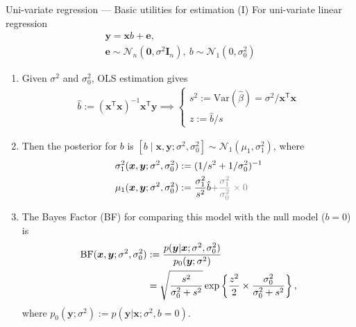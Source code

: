 \documentclass[10pt]{beamer}
\begin{document}
\begin{frame}[allowframebreaks]{Uni-variate regression --- \normalsize Basic utilities for estimation (I)}
    For uni-variate linear regression
    \begin{gather}
        \bm{y} = \bm{x}b + \bm{e},\\
        \bm{e} \sim \mathcal{N}_n(\bm{0},\sigma^2\bm{I}_n),\
        b\sim\mathcal{N}_1(0,\sigma^2_0)
    \end{gather}
    \begin{enumerate}
        \item Given $\sigma^2$ and $\sigma_0^2$, OLS estimation gives
        \begin{gather}
            \hat{b} := (\bm{x}^\mathsf{T}\bm{x})^{-1}\bm{x}^\mathsf{T}\bm{y}
            \implies \begin{cases}
                s^2 := \text{Var}(\hat{\beta}) = {\sigma^2}/{\bm{x}^\mathsf{T}\bm{x}} \\
                z := {\hat{b}}/{s}
            \end{cases}
        \end{gather}

        \item Then the posterior for $b$ is $[b\mid\bm{x},\bm{y};\sigma^2,\sigma_0^2]\sim\mathcal{N}_1(\mu_1,\sigma^2_1)$, where
        \begin{align}
            \sigma_1^2(\bm{x},\bm{y};\sigma^2,\sigma_0^2) 
            & := (1/s^2 + 1/\sigma_0^2)^{-1} \\
            \mu_1(\bm{x},\bm{y};\sigma^2,\sigma_0^2) 
            & := \frac{\sigma_1^2}{s^2}\hat{b}{\color{gray} + \frac{\sigma_1^2}{\sigma_0^2}\times 0}
        \end{align}
        
        \newpage
        
        \item The Bayes Factor (BF) for comparing this model with the null model ($b=0$) is
        \begin{align}
            \text{BF}(\bm{x},\bm{y};\sigma^2,\sigma_0^2)
            & := \frac{p(\bm{y}|\bm{x};\sigma^2,\sigma_0^2)}{p_0(\bm{y};\sigma^2)} \notag\\
            & = \sqrt{\frac{s^2}{\sigma_0^2 + s^2}}\exp\left\{
                \frac{z^2}{2}\times\frac{\sigma_0^2}{\sigma_0^2+s^2}
            \right\},\label{eq:univarbf}
        \end{align}
        where $p_0(\bm{y};\sigma^2):=p(\bm{y}|\bm{x};\sigma^2,b=0)$.
    \end{enumerate}
\end{frame}
\end{document}
